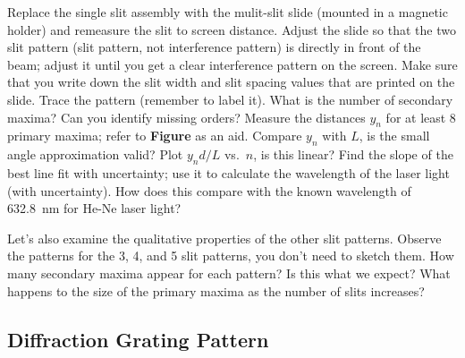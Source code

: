Replace the single slit assembly with the mulit-slit slide (mounted in a 
magnetic holder) and remeasure the slit to screen distance.  Adjust the slide
so that the two slit pattern (slit pattern, not interference pattern) is 
directly in front of the beam; adjust it until you get a clear interference 
pattern on the screen. Make sure that you write down the slit width and slit 
spacing values that are printed on the slide. Trace the pattern (remember to 
label it).  What is the number of secondary maxima?  Can you identify missing 
orders? Measure the distances $y_n$ for at least 8 primary maxima; refer to 
{\bf Figure} as an aid.
%
%
Compare $y_n$ with $L$, is the small angle approximation valid? Plot $y_n d/L$ 
vs.~$n$, is this linear? Find the slope of the best line fit with uncertainty;
use it to calculate the wavelength of the laser light (with uncertainty).
How does this compare with the known wavelength of 632.8~nm for He-Ne laser
light?

Let's also examine the qualitative properties of the other slit patterns. 
Observe the patterns for the 3, 4, and 5 slit patterns, you don't need to 
sketch them.  How many secondary maxima appear for each pattern? Is this what
we expect?  What happens to the size of the primary maxima as the number of 
slits increases?

\subsection{Diffraction Grating Pattern} 

